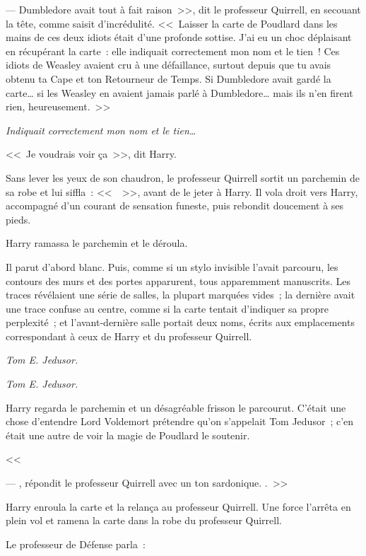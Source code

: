 --- Dumbledore avait tout à fait raison~>>, dit le professeur Quirrell, en secouant la tête, comme saisit d'incrédulité. <<~Laisser la carte de Poudlard dans les mains de ces deux idiots était d'une profonde sottise. J'ai eu un choc déplaisant en récupérant la carte~: elle indiquait correctement mon nom et le tien~! Ces idiots de Weasley avaient cru à une défaillance, surtout depuis que tu avais obtenu ta Cape et ton Retourneur de Temps. Si Dumbledore avait gardé la carte… si les Weasley en avaient jamais parlé à Dumbledore… mais ils n'en firent rien, heureusement.~>>

\emph{Indiquait correctement mon nom et le tien…}

<<~Je voudrais voir ça~>>, dit Harry.

Sans lever les yeux de son chaudron, le professeur Quirrell sortit un parchemin de sa robe et lui siffla~: <<~~>>, avant de le jeter à Harry. Il vola droit vers Harry, accompagné d'un courant de sensation funeste, puis rebondit doucement à ses pieds.

Harry ramassa le parchemin et le déroula.

Il parut d'abord blanc. Puis, comme si un stylo invisible l'avait parcouru, les contours des murs et des portes apparurent, tous apparemment manuscrits. Les traces révélaient une série de salles, la plupart marquées vides~; la dernière avait une trace confuse au centre, comme si la carte tentait d'indiquer sa propre perplexité~; et l'avant-dernière salle portait deux noms, écrits aux emplacements correspondant à ceux de Harry et du professeur Quirrell.

\emph{Tom E. Jedusor.}

\emph{Tom E. Jedusor.}

Harry regarda le parchemin et un désagréable frisson le parcourut. C'était une chose d'entendre Lord Voldemort prétendre qu'on s'appelait Tom Jedusor~; c'en était une autre de voir la magie de Poudlard le soutenir.

<<~

--- , répondit le professeur Quirrell avec un ton sardonique. .~>>

Harry enroula la carte et la relança au professeur Quirrell. Une force l'arrêta en plein vol et ramena la carte dans la robe du professeur Quirrell.

Le professeur de Défense parla~:

